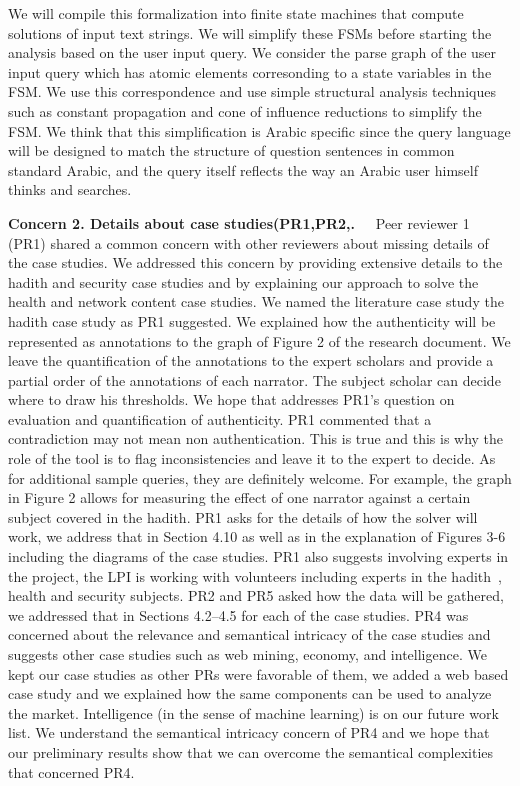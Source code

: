 \documentclass[12pt]{article}
\begin{document}
We will compile this formalization into finite state machines that
compute solutions of input text strings.
We will simplify these FSMs before starting the analysis 
based on the user input query.
We consider the parse graph of the user input query 
which has atomic elements corresonding to a state variables
in the FSM.
We use this correspondence and use simple structural analysis 
techniques such as constant propagation and cone of influence
reductions to simplify the FSM. 
We think that this simplification is Arabic specific since
the query language will be designed to match the
structure of question sentences in common standard Arabic,
and the query itself reflects the way an Arabic user
himself thinks and searches. 

{\bf Concern 2. Details about case studies(PR1,PR2,.~~}
Peer reviewer 1 (PR1) shared a common concern with other reviewers
about missing details of the case studies. 
We addressed this concern by providing extensive details to the
hadith and security case studies and by explaining our
approach to solve the health and network content case studies.
We named the literature case study the hadith case study as 
PR1 suggested. 
We explained how the authenticity will be represented as annotations
to the graph of Figure 2 of the research document. 
We leave the quantification of the annotations to the expert
scholars %
and provide a partial order of the annotations of each narrator.
The subject scholar can decide where to draw his thresholds. 
We hope that addresses PR1's question on evaluation and quantification
of authenticity.
PR1 commented that a contradiction may not mean non authentication.
This is true and this is why the role of the tool is to flag 
inconsistencies and leave it to the expert to decide. 
As for additional sample queries, they are definitely welcome.
For example, the graph in Figure 2 allows 
for measuring the effect of one narrator 
against a certain subject covered in the hadith. 
PR1 asks for the details of how the solver will work, we address that 
in Section 4.10 as well as in the explanation of Figures 3-6 including
the diagrams of the case studies. 
PR1 also suggests involving experts in the project, the LPI is 
working with volunteers including experts in the hadith~\cite{Zar06},
health and security subjects. 
PR2 and PR5 asked how the data will be gathered, we 
addressed that in Sections
4.2--4.5 for each of the case studies. 
PR4 was concerned about the relevance and semantical intricacy 
of the case studies and suggests other case studies such as
web mining, economy, and intelligence. 
We kept our case studies as other PRs were favorable of them,
we added a web based case study and we explained how the same 
components can be used to analyze the market.
Intelligence (in the sense of machine learning) is on our future 
work list.
We understand the semantical intricacy concern of PR4 and we hope
that our preliminary results show that we can overcome 
the semantical complexities that concerned PR4. 
\end{document}
